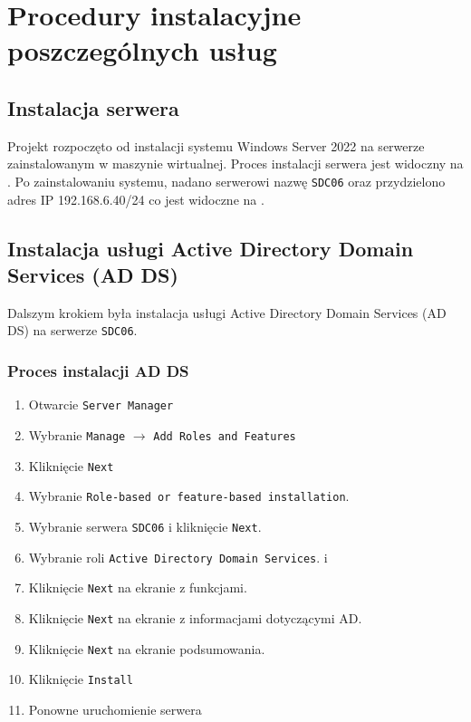 	\newpage
\section{Procedury instalacyjne poszczególnych usług}		%

\subsection{Instalacja serwera}

Projekt rozpoczęto od instalacji systemu Windows Server 2022 na serwerze zainstalowanym w maszynie wirtualnej. Proces instalacji serwera jest widoczny na . Po zainstalowaniu systemu, nadano serwerowi nazwę \texttt{SDC06} oraz przydzielono adres IP 192.168.6.40/24 co jest widoczne na .

\clearpage
{}
\subsection{Instalacja usługi Active Directory Domain Services (AD DS)}
Dalszym krokiem była instalacja usługi Active Directory Domain Services (AD DS) na serwerze \texttt{SDC06}.

\subsubsection{Proces instalacji AD DS}
\begin{enumerate}
\item Otwarcie \texttt{Server Manager}
\item Wybranie \texttt{Manage} $\rightarrow$ \texttt{Add Roles and Features}
\item Kliknięcie \texttt{Next}
\item Wybranie \texttt{Role-based or feature-based installation}. 
\item Wybranie serwera \texttt{SDC06} i kliknięcie \texttt{Next}. 
\item Wybranie roli \texttt{Active Directory Domain Services}. i 
\item Kliknięcie \texttt{Next} na ekranie z funkcjami. 
\item Kliknięcie \texttt{Next} na ekranie z informacjami dotyczącymi AD. 
\item Kliknięcie \texttt{Next} na ekranie podsumowania. 
\item Kliknięcie \texttt{Install}
\item Ponowne uruchomienie serwera
\end{enumerate}

